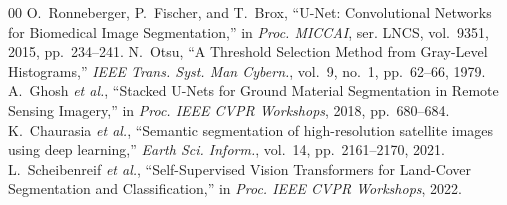 \documentclass[journal]{IEEEtran}
\begin{document}
\begin{thebibliography}{00}
 O.~Ronneberger, P.~Fischer, and T.~Brox, ``U-Net: Convolutional Networks for Biomedical Image Segmentation,'' in \textit{Proc. MICCAI}, ser. LNCS, vol.~9351, 2015, pp.~234--241.
 N.~Otsu, ``A Threshold Selection Method from Gray-Level Histograms,'' \textit{IEEE Trans. Syst. Man Cybern.}, vol.~9, no.~1, pp.~62--66, 1979.
 A.~Ghosh \textit{et al.}, ``Stacked U-Nets for Ground Material Segmentation in Remote Sensing Imagery,'' in \textit{Proc. IEEE CVPR Workshops}, 2018, pp.~680--684.
 K.~Chaurasia \textit{et al.}, ``Semantic segmentation of high-resolution satellite images using deep learning,'' \textit{Earth Sci. Inform.}, vol.~14, pp.~2161--2170, 2021.
 L.~Scheibenreif \textit{et al.}, ``Self-Supervised Vision Transformers for Land-Cover Segmentation and Classification,'' in \textit{Proc. IEEE CVPR Workshops}, 2022.
\end{thebibliography}
\end{document}
